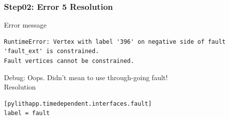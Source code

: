 \documentclass[aspectration=169]{beamer}
\newcommand{\errlabel}[1]{{\small \color{blue}#1}}
\newcommand{\debuginfo}[1]{{\small \color{green}#1}}
\begin{document}
\begin{frame}[fragile]
  \frametitle{Step02: Error 5 Resolution}

\errlabel{Error message}
\begin{lstlisting}
RuntimeError: Vertex with label '396' on negative side of fault 'fault_ext' is constrained.
Fault vertices cannot be constrained.
\end{lstlisting}\pause
\errlabel{Debug:} \debuginfo{Oops. Didn't mean to use through-going fault!}\pause\\
\errlabel{Resolution}
\begin{lstlisting}
[pylithapp.timedependent.interfaces.fault]
label = fault
\end{lstlisting}

\end{frame}
\end{document}
